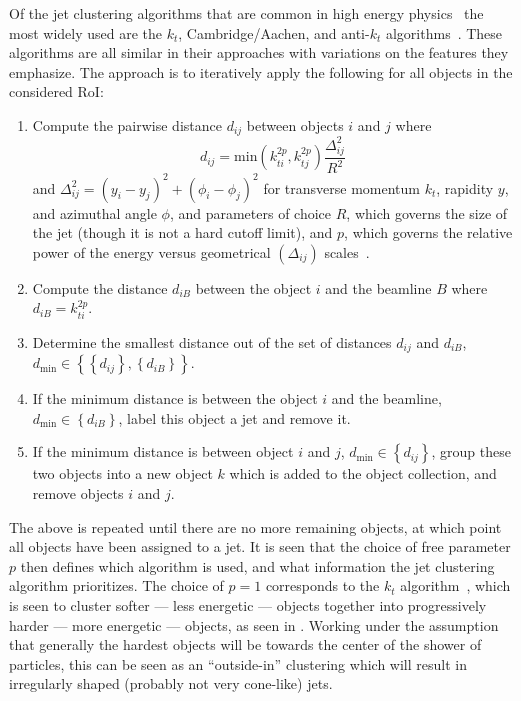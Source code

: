 Of the jet clustering algorithms that are common in high energy physics~\cite{Salam:2009jx,Salam:2007xv} the most widely used are the $k_{t}$, Cambridge/Aachen, and anti-$k_{t}$ algorithms~\cite{Cacciari:2008gp,Soyez:2008pq}.
These algorithms are all similar in their approaches with variations on the features they emphasize.
The approach is to iteratively apply the following for all objects in the considered RoI:
\begin{enumerate}
 \item Compute the pairwise distance $d_{ij}$ between objects $i$ and $j$ where
       \[
        d_{ij} = \textrm{min}\left(k_{ti}^{2p}, k_{tj}^{2p}\right) \frac{\Delta_{ij}^{2}}{R^{2}}
       \]
       and $\Delta_{ij}^{2} = \left(y_{i} - y_{j}\right)^{2} + \left(\phi_{i} - \phi_{j}\right)^{2}$ for transverse momentum $k_{t}$, rapidity $y$, and azimuthal angle $\phi$, and parameters of choice $R$, which governs the size of the jet (though it is not a hard cutoff limit), and $p$, which governs the relative power of the energy versus geometrical $\left(\Delta_{ij}\right)$ scales~\cite{Cacciari:2008gp}.
 \item Compute the distance $d_{iB}$ between the object $i$ and the beamline $B$ where $d_{iB} = k_{ti}^{2p}$.
 \item Determine the smallest distance out of the set of distances $d_{ij}$ and $d_{iB}$, $d_{\mathrm{min}} \in \left\{\left\{d_{ij}\right\},\left\{d_{iB}\right\}\right\}$.
 \item If the minimum distance is between the object $i$ and the beamline, $d_{\mathrm{min}} \in \left\{d_{iB}\right\}$, label this object a jet and remove it.
 \item If the minimum distance is between object $i$ and $j$, $d_{\mathrm{min}} \in \left\{d_{ij}\right\}$, group these two objects into a new object $k$ which is added to the object collection, and remove objects $i$ and $j$.
\end{enumerate}
The above is repeated until there are no more remaining objects, at which point all objects have been assigned to a jet.
It is seen that the choice of free parameter $p$ then defines which algorithm is used, and what information the jet clustering algorithm prioritizes.
The choice of $p=1$ corresponds to the $k_{t}$ algorithm~\cite{Catani:1993hr}, which is seen to cluster softer --- less energetic --- objects together into progressively harder --- more energetic --- objects, as seen in .
Working under the assumption that generally the hardest objects will be towards the center of the shower of particles, this can be seen as an ``outside-in'' clustering which will result in irregularly shaped (probably not very cone-like) jets.
